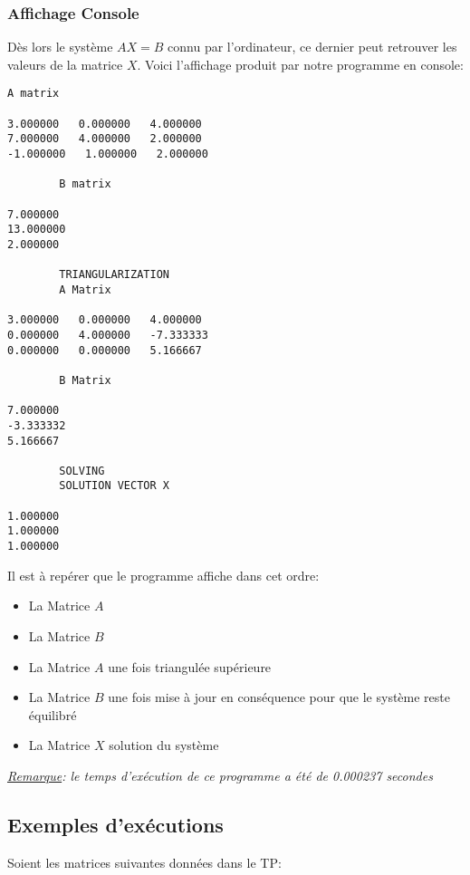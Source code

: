 \subsubsection{Affichage Console}
Dès lors le système $AX=B$ connu par l'ordinateur, ce dernier peut retrouver les valeurs de la matrice $X$. Voici l'affichage produit par notre programme en console: \\
\begin{lstlisting}[caption=Console Display of the Gauss elimination for the AX=B system mentioned above, basicstyle=\fontsize{6}{8}\selectfont]
		A matrix 

3.000000   0.000000   4.000000   
7.000000   4.000000   2.000000   
-1.000000   1.000000   2.000000   

		B matrix 

7.000000   
13.000000   
2.000000   

		TRIANGULARIZATION 
		A Matrix 

3.000000   0.000000   4.000000   
0.000000   4.000000   -7.333333   
0.000000   0.000000   5.166667   

		B Matrix 

7.000000   
-3.333332   
5.166667   

		SOLVING 
		SOLUTION VECTOR X 

1.000000   
1.000000   
1.000000   

\end{lstlisting}
Il est à repérer que le programme affiche dans cet ordre: \\
\begin{itemize}
\item La Matrice $A$ 
\item La Matrice $B$
\item La Matrice $A$ une fois triangulée supérieure
\item La Matrice $B$ une fois mise à jour en conséquence pour que le système reste équilibré
\item La Matrice $X$ solution du système
\end{itemize}

\textit{\underline{Remarque}: le temps d'exécution de ce programme a été de 0.000237 secondes}
\subsection{Exemples d'exécutions}

Soient les matrices suivantes données dans le TP:\\

